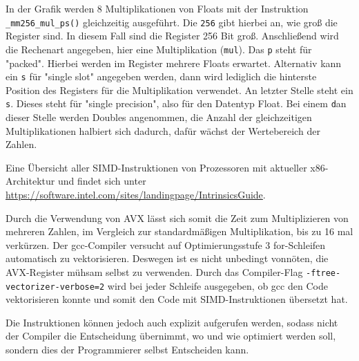 \documentclass[../main.tex]{subfiles}
\begin{document}
In der Grafik werden 8 Multiplikationen von Floats mit der Instruktion \texttt{\_mm256\_mul\_ps()} gleichzeitig ausgeführt. Die \texttt{256} gibt hierbei an, wie groß die Register sind. In diesem Fall sind die Register 256 Bit groß. Anschließend wird die Rechenart angegeben, hier eine Multiplikation (\texttt{mul}). Das \texttt{p} steht für "packed". Hierbei werden im Register mehrere Floats erwartet. Alternativ kann ein \texttt{s} für "single slot" angegeben werden, dann wird lediglich die hinterste Position des Registers für die Multiplikation verwendet. An letzter Stelle steht ein \texttt{s}. Dieses steht für "single precision", also für den Datentyp Float. Bei einem \texttt{d}an dieser Stelle werden Doubles angenommen, die Anzahl der gleichzeitigen Multiplikationen halbiert sich dadurch, dafür wächst der Wertebereich der Zahlen.

Eine Übersicht aller SIMD-Instruktionen von Prozessoren mit aktueller x86-Architektur und findet sich unter \url{https://software.intel.com/sites/landingpage/IntrinsicsGuide}. 

Durch die Verwendung von AVX lässt sich somit die Zeit zum Multiplizieren von mehreren Zahlen, im Vergleich zur standardmäßigen Multiplikation, bis zu 16 mal verkürzen. Der gcc-Compiler versucht auf Optimierungsstufe 3 for-Schleifen automatisch zu vektorisieren. Deswegen ist es nicht unbedingt vonnöten, die AVX-Register mühsam selbst zu verwenden. Durch das Compiler-Flag \texttt{-ftree-vectorizer-verbose=2} wird bei jeder Schleife ausgegeben, ob gcc den Code vektorisieren konnte und somit den Code mit SIMD-Instruktionen übersetzt hat.

Die Instruktionen können jedoch auch explizit aufgerufen werden, sodass nicht der Compiler die Entscheidung übernimmt, wo und wie optimiert werden soll, sondern dies der Programmierer selbst Entscheiden kann. 
\end{document}
